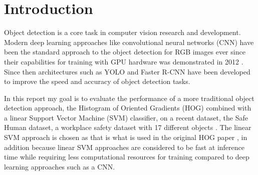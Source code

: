 \section{Introduction}

Object detection is a core task in computer vision research and development. 
Modern deep learning approaches like convolutional neural networks (CNN) have been the standard approach to the object detection for RGB images ever since their capabilities for training with GPU hardware was demonstrated in 2012 \cite{alexnet}.
Since then architectures such as YOLO \cite{yolo} and Faster R-CNN \cite{ren2016fasterrcnnrealtimeobject} have been developed to improve the speed and accuracy of object detection tasks.

In this  report my goal is to evaluate the performance of a more traditional object detection approach, the Histogram of Oriented Gradients (HOG) combined with a linear Support Vector Machine (SVM) classifier, on a recent dataset, the Safe Human dataset, a workplace safety dataset with 17 different objects \cite{ahmad2024sh17datasethumansafety}.
The linear SVM approach is chosen as that is what is used in the original HOG paper \cite{HOGpaper}, in addition because linear SVM approaches are considered to be fast at inference time while requiring less computational resources for training compared to deep learning approaches such as a CNN.